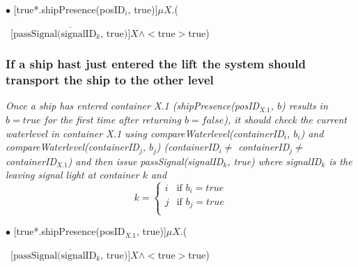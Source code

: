 $ \bullet $ [true*.shipPresence(posID$_i$, true)]$ \mu X$.(
\begin{flushright}
	~[$ \overline{\textrm{passSignal(signalID$_k$, true)}} ]X \wedge <$true$>$true)
\end{flushright}

\subsubsection{If a ship hast just entered the lift the system should transport the ship to the other level}
\textit{Once a ship has entered container X.1 (shipPresence(posID$_{X.1}$, $b$) results in $b = true$ for the first time after returning $b = false$), it should check the current waterlevel in container X.1 using compareWaterlevel(containerID$_i$, $b_i$) and \linebreak compareWaterlevel(containerID$_j$, $b_j$) (containerID$_i \neq$ containerID$_j \neq$ \linebreak containerID$_{X.1}$) and then issue passSignal(signalID$_k$, true) where signalID$_k$ is the leaving signal light at container $k$ and
	\begin{equation*}
	k = 
	\begin{cases}
	i & \text{if } b_i = true\\
	j & \text{if } b_j = true\\
	\end{cases}
	\end{equation*}
}\vspace{0.3cm}

$ \bullet $ [true*.shipPresence(posID$_{X.1}$, true)]$ \mu X$.(
\begin{flushright}
	~[$ \overline{\textrm{passSignal(signalID$_k$, true)}} ]X \wedge <$true$>$true)
\end{flushright}